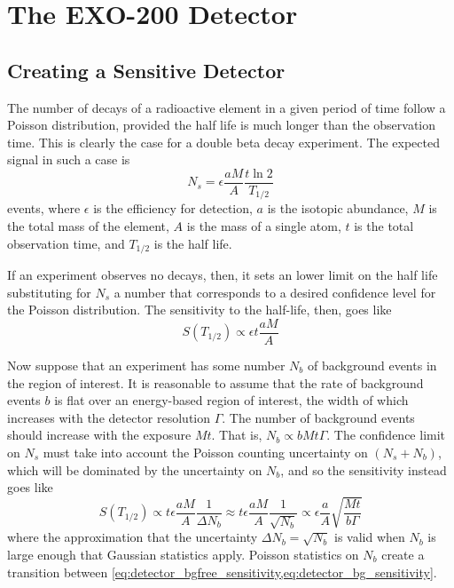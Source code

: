 \documentclass[herrin-thesis.tex]{subfiles}
\begin{document}
\chapter{The EXO-200 Detector}
\label{ch:detector}

\section{Creating a Sensitive Detector}
The number of decays of a radioactive element in a given period of time follow a Poisson distribution, provided the half life is much longer than the observation time. This is clearly the case for a double beta decay experiment. The expected signal in such a case is
\begin{equation}
N_{s} = \epsilon \frac{a M}{A} \frac{t \ln2}{T_{1/2}}
\label{eq:detector_N_expected}
\end{equation}
events, where  \(\epsilon\) is the efficiency for detection, \(a\) is the isotopic abundance, \(M\) is the total mass of the element, \(A\) is the mass of a single atom, \(t\) is the total observation time, and \(T_{1/2}\) is the half life.

If an experiment observes no decays, then, it sets an lower limit on the half life substituting for \(N_s\) a number that corresponds to a desired confidence level for the Poisson distribution. The sensitivity to the half-life, then, goes like
\begin{equation}
S(T_{1/2}) \propto \epsilon t \frac{a M}{A}
\label{eq:detector_bgfree_sensitivity}
\end{equation}

Now suppose that an experiment has some number \(N_b\) of background events in the region of interest. It is reasonable to assume that the rate of background events \(b\) is flat over an energy-based region of interest, the width of which increases with the detector resolution \(\Gamma\). The number of background events should increase with the exposure \(M t\). That is, \(N_b \propto b M t \Gamma\). The confidence limit on \(N_s\) must take into account the Poisson counting uncertainty on \((N_s + N_b)\), which will be dominated by the uncertainty on \(N_b\), and so the sensitivity instead goes like
\begin{equation}
S(T_{1/2}) \propto t \epsilon \frac{a M}{A} \frac{1}{\Delta N_b} \approx t \epsilon \frac{a M}{A} \frac{1}{\sqrt{N_b}} \propto \epsilon \frac{a}{A} \sqrt{\frac{M t}{b \Gamma}}
\label{eq:detector_bg_sensitivity}
\end{equation}
where the approximation that the uncertainty \(\Delta N_b = \sqrt{N_b}\) is valid when \(N_b\) is large enough that Gaussian statistics apply. Poisson statistics on \(N_b\) create a transition between \cref{eq:detector_bgfree_sensitivity,eq:detector_bg_sensitivity}.
\end{document}
